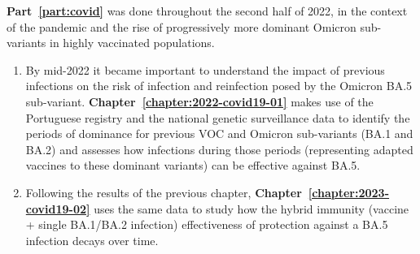 \textbf{Part~\ref{part:covid}} was done throughout the second half of 2022, in the context of the \covid pandemic and the rise of progressively more dominant \sars Omicron sub-variants in highly vaccinated populations.

\begin{enumerate}
    \setlength{\itemsep}{1.5pt}
    \setlength{\parskip}{0pt}
    \setlength{\parsep}{0pt}
    \setcounter{enumi}{6}

    \item By mid-2022 it became important to understand the impact of previous infections on the risk of infection and reinfection posed by the Omicron BA.5 sub-variant. \textbf{Chapter~\ref{chapter:2022-covid19-01}} makes use of the Portuguese \covid registry and the national \sars genetic surveillance data to identify the periods of dominance for previous VOC and Omicron sub-variants (BA.1 and BA.2) and assesses how infections during those periods (representing adapted vaccines to these dominant variants) can be effective against BA.5.

    \item Following the results of the previous chapter, \textbf{Chapter~\ref{chapter:2023-covid19-02}} uses the same data to study how the hybrid immunity (vaccine + single BA.1/BA.2 infection) effectiveness of protection against a BA.5 infection decays over time.
\end{enumerate}



